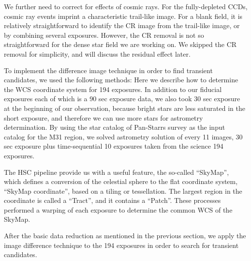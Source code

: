 \documentclass[iop, apj]{emulateapj}
\newcommand{\?}{\stackrel{?}{=}}
\begin{document}
We further need to correct for effects of cosmic rays. For the fully-depleted CCDs, cosmic ray events imprint a characteristic trail-like image. For a blank field, it is relatively straightforward to identify the CR image from the trail-like image, or by combining several exposures. However, the CR removal is not so straightforward for the dense star field we are working on. We skipped the CR removal for simplicity, and will discuss the residual effect later. 


To implement the difference image technique in order to find transient candidates, we used the following methods:
Here we describe how to determine the WCS coordinate system for 194 exposures. In addition to our fiducial exposures each of which is a 90 sec exposure data, we also took 30 sec exposure at the beginning of our observation, because bright stars are less saturated in the short exposure, and therefore we can use more stars for astrometry determination. By using the star catalog of Pan-Starrs survey as the input catalog for the M31 region, we solved astrometry solution of every 11 images, 30 sec exposure plus time-sequential 10 exposures taken from the science 194 exposures. 

The HSC pipeline provide us with a useful feature, the so-called ``SkyMap'', which defines a conversion of the celestial sphere to the flat coordinate system, ``SkyMap coordinate'', based on a tiling or tessellation. The largest region in the coordinate  is called a ``Tract'', and it contains a ``Patch''. These processes performed a warping of each exposure to determine the common WCS of the SkyMap.
%
%

After the basic data reduction as mentioned in the previous section, we apply the image difference technique to the 194 exposures in order to search for transient candidates. 
\end{document}
